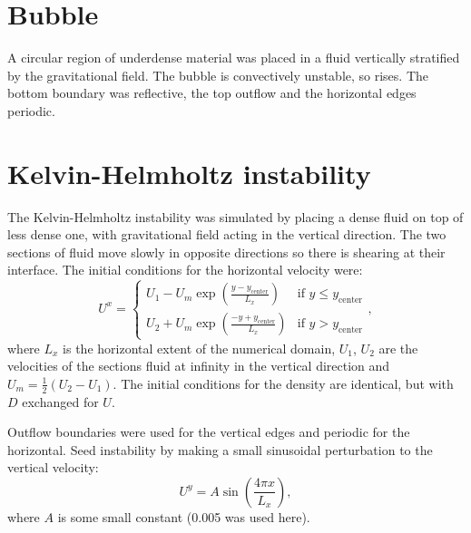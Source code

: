 \section{Bubble}
\label{sec:Bubble}
A circular region of underdense material was placed in a fluid vertically stratified by the gravitational field. The bubble is convectively unstable, so rises. The bottom boundary was reflective, the top outflow and the horizontal edges periodic.

\section{Kelvin-Helmholtz instability}
\label{sec:Kelvin-Helmholtz}
The Kelvin-Helmholtz instability was simulated by placing a dense fluid on top of less dense one, with gravitational field acting in the vertical direction. The two sections of fluid move slowly in opposite directions so there is shearing at their interface. The initial conditions for the horizontal velocity were:
\begin{equation}
U^x = \begin{cases} U_1 - U_m\exp\left(\frac{y - y_\text{center}}{L_x}\right) & \text{if } y \leq y_\text{center}\\
U_2 + U_m\exp\left(\frac{-y + y_\text{center}}{L_x}\right) & \text{if } y > y_\text{center}\end{cases},
\end{equation}
where \(L_x\) is the horizontal extent of the numerical domain, \(U_1\), \(U_2\) are the velocities of the sections fluid at infinity in the vertical direction and \(U_m = \frac{1}{2}(U_2-U_1)\). The initial conditions for the density are identical, but with \(D\) exchanged for \(U\).

Outflow boundaries were used for the vertical edges and periodic for the horizontal. Seed instability by making a small sinusoidal perturbation to the vertical velocity:
\begin{equation}
U^y = A \sin\left(\frac{4 \pi x}{L_x}\right),
\end{equation}
where \(A\) is some small constant (0.005 was used here).


